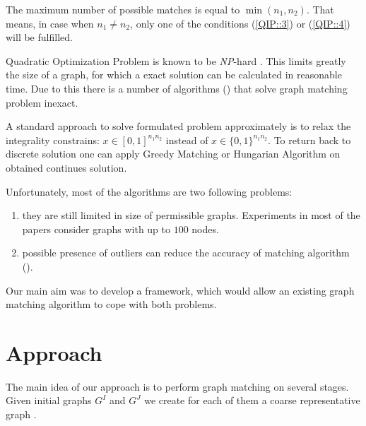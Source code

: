 \documentclass[
	fontsize=12pt,
	paper=a4,
	twoside=false,
	numbers=noenddot,
	plainheadsepline,
	toc=listof,
	toc=bibliography
]{scrartcl}
\begin{document}
The maximum number of possible matches is equal to $\min(n_1, n_2)$. That means, in case when $n_1\not = n_2$, only one of the conditions (\ref{QIP::3}) or (\ref{QIP::4}) will be fulfilled.

Quadratic Optimization Problem is known to be \emph{NP}-hard \cite{Sahni1974}. This limits greatly the size of a graph, for which a exact solution can be calculated in reasonable time. Due to this there is a number of algorithms () that solve graph matching problem inexact.

A standard approach to solve formulated problem approximately is to relax the integrality constrains: $x\in [0,1]^{n_1n_2}$ instead of  $x\in \{0,1\}^{n_1n_2}$. To return back to discrete solution one can apply Greedy Matching or Hungarian Algorithm \cite{Kuhn1955} on obtained continues solution.

Unfortunately, most of the algorithms are two following problems:
\begin{enumerate}
\item they are still limited in size of permissible graphs. Experiments in most of the papers consider graphs with up to $100$ nodes.
\item possible presence of outliers can reduce the accuracy of matching algorithm (\cite{Suh_CVPR2015}).
\end{enumerate}  

Our main aim was to develop a framework, which would allow an existing graph matching algorithm to cope with both problems.



\section{Approach}

The main idea of our approach is to perform graph matching on several stages. Given initial graphs $G^I$ and $G^J$ we create for each of them a coarse representative graph $$.





\end{document}
